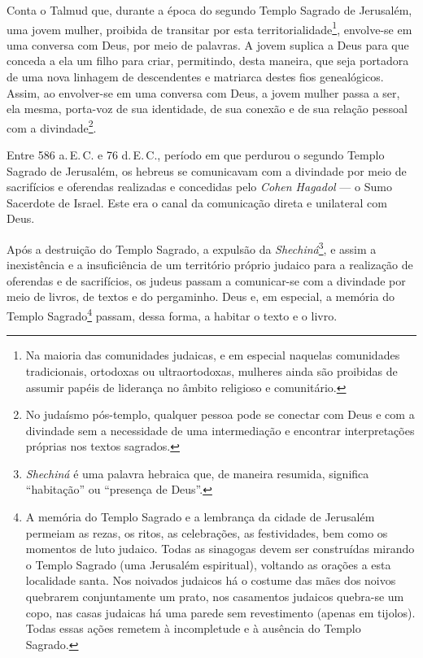 
\noindent{}Conta o Talmud que, durante a época do segundo Templo Sagrado de
Jerusalém, uma jovem mulher, proibida de transitar por esta
territorialidade\footnote{Na maioria das comunidades judaicas, e em
  especial naquelas comunidades tradicionais, ortodoxas ou
  ultraortodoxas, mulheres ainda são proibidas de assumir papéis de
  liderança no âmbito religioso e comunitário.}, envolve-se em uma
conversa com Deus, por meio de palavras. A jovem suplica a Deus para que
conceda a ela um filho para criar, permitindo, desta maneira, que seja
portadora de uma nova linhagem de descendentes e matriarca destes fios
genealógicos. Assim, ao envolver-se em uma conversa com Deus, a jovem
mulher passa a ser, ela mesma, porta-voz de sua identidade, de sua
conexão e de sua relação pessoal com a divindade\footnote{No judaísmo
  pós-templo, qualquer pessoa pode se conectar com Deus e com a
  divindade sem a necessidade de uma intermediação e encontrar
  interpretações próprias nos textos sagrados.}.

Entre 586 a.\,E.\,C. e 76 d.\,E.\,C., período em que perdurou o segundo Templo
Sagrado de Jerusalém, os hebreus se comunicavam com a divindade por meio
de sacrifícios e oferendas realizadas e concedidas pelo \emph{Cohen
Hagadol} --- o Sumo Sacerdote de Israel. Este era o canal da comunicação
direta e unilateral com Deus.

Após a destruição do Templo Sagrado, a expulsão da
\emph{Shechiná}\footnote{\emph{Shechiná} é uma palavra hebraica que, de
  maneira resumida, significa ``habitação'' ou ``presença de Deus''.}, e
assim a inexistência e a insuficiência de um território próprio judaico
para a realização de oferendas e de sacrifícios, os judeus passam a
comunicar-se com a divindade por meio de livros, de textos e do
pergaminho. Deus e, em especial, a memória do Templo Sagrado\footnote{A
  memória do Templo Sagrado e a lembrança da cidade de Jerusalém
  permeiam as rezas, os ritos, as celebrações, as festividades, bem como
  os momentos de luto judaico. Todas as sinagogas devem ser construídas
  mirando o Templo Sagrado (uma Jerusalém espiritual), voltando as
  orações a esta localidade santa. Nos noivados judaicos há o costume
  das mães dos noivos quebrarem conjuntamente um prato, nos casamentos
  judaicos quebra-se um copo, nas casas judaicas há uma parede sem
  revestimento (apenas em tijolos). Todas essas ações remetem à
  incompletude e à ausência do Templo Sagrado.} passam, dessa forma, a
habitar o texto e o livro.

